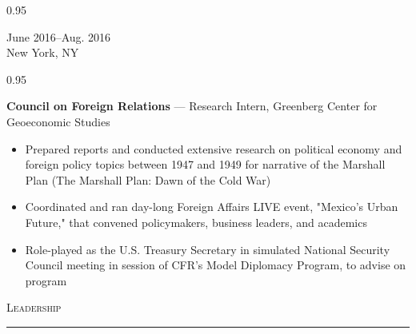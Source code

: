 \documentclass[a4paper,9pt]{article}
\newcommand{\mainMarginBottom}{\vspace*{1.5pt}}
\newcommand{\newLine}{\\}
\newcommand{\doubleColumnGap}{\hspace{4mm}}
\newcommand{\sectionMarginTopBottom}{\vspace*{7.5pt}}
\newcommand{\sectionMarginBetweenRemove}{\vspace{-5ex}}
\newcommand{\sectionMarginBetweenAdd}{\vspace{20pt}}
\newcommand{\mainLineSpacing}{0.95}
\def\hrulefill{\leavevmode\leaders\hrule height 1.75pt\hfill\kern0pt}
\begin{document}
\begin{minipage}[t]{0.20\linewidth}
  \begin{small}
    \begin{spacing}\mainLineSpacing{}
      \begin{flushright}
        June 2016--Aug. 2016
        \newLine{}
        \mainMarginBottom{}
        New York, NY
      \end{flushright}
    \end{spacing}
  \end{small}
\end{minipage}
\doubleColumnGap{}
\begin{minipage}[t]{0.75\linewidth}
  \begin{small}
    \begin{spacing}\mainLineSpacing{}
      \begin{flushleft}
        \textbf{Council on Foreign Relations} --- Research Intern, Greenberg Center for Geoeconomic Studies
        \mainMarginBottom{}
        \begin{itemize}[itemsep=0pt,topsep=0pt,leftmargin=*]
          \item Prepared reports and conducted extensive research on political economy and foreign policy topics between 1947 and 1949 for narrative of the Marshall Plan (The Marshall Plan: Dawn of the Cold War)
          \item Coordinated and ran day-long Foreign Affairs LIVE event, "Mexico's Urban Future," that convened policymakers, business leaders, and academics
          \item Role-played as the U.S. Treasury Secretary in simulated National Security Council meeting in session of CFR's Model Diplomacy Program, to advise on program
        \end{itemize}
      \end{flushleft}
    \end{spacing}
  \end{small}
\end{minipage}

\sectionMarginBetweenRemove{}
\sectionMarginBetweenAdd{}

\hspace*{11pt}\textsc{\fontsize{20}{24}\selectfont Leadership}\hspace*{14pt}\hrulefill
\sectionMarginTopBottom{}
\end{document}
